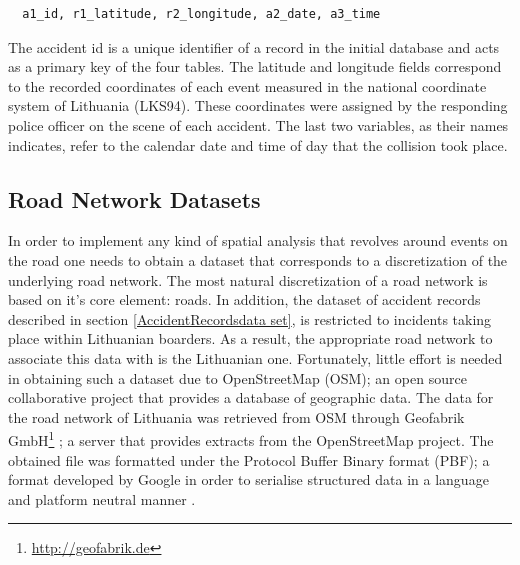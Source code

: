 \documentclass[12pt]{article}
\theoremstyle{definition}
\begin{document}
\begin{verbatim}
  a1_id, r1_latitude, r2_longitude, a2_date, a3_time
\end{verbatim}

The accident id is a unique identifier of a record in the initial database and acts as a primary key of the four tables. The latitude and longitude fields correspond to the recorded coordinates of each event measured in the national coordinate system of Lithuania (LKS94). These coordinates were assigned by the responding police officer on the scene of each accident. The last two variables, as their names indicates, refer to the calendar date and time of day that the collision took place.

\subsection{Road Network Datasets} \label{RoadNetworkdataSets}
In order to implement any kind of spatial analysis that revolves around events on the road one needs to obtain a dataset that corresponds to a discretization of the underlying road network. The most natural discretization of a road network is based on it's core element: roads. In addition, the dataset of accident records described in section \ref{AccidentRecordsdata set}, is restricted to incidents taking place within Lithuanian boarders. As a result, the appropriate road network to associate this data with is the Lithuanian one. Fortunately, little effort is needed in obtaining such a dataset due to OpenStreetMap (OSM)\cite{OpenStreetMap}; an open source collaborative project that provides a database of geographic data. The data for the road network of Lithuania was retrieved from OSM through Geofabrik GmbH\footnote{\url{http://geofabrik.de}} \cite{GeoFabrikLT}; a server that provides extracts from the OpenStreetMap project. The obtained file was formatted under the Protocol Buffer Binary format (PBF); a format developed by Google in order to serialise structured data in a language and platform neutral manner \cite{PBF}.  
\end{document}
